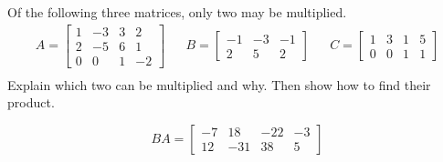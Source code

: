 
\begin{exerciseStatement}


Of the following three matrices, only two may be multiplied. 
\begin{align*} A= \left[\begin{array}{cccc}
1 & -3 & 3 & 2 \\
2 & -5 & 6 & 1 \\
0 & 0 & 1 & -2
\end{array}\right]  & & B= \left[\begin{array}{ccc}
-1 & -3 & -1 \\
2 & 5 & 2
\end{array}\right]  & & C= \left[\begin{array}{cccc}
1 & 3 & 1 & 5 \\
0 & 0 & 1 & 1
\end{array}\right]  \\ \end{align*}
             Explain which two can be multiplied and why. Then show how to find their product.


\end{exerciseStatement}
    
\begin{exerciseAnswer} 
\[BA= \left[\begin{array}{cccc}
-7 & 18 & -22 & -3 \\
12 & -31 & 38 & 5
\end{array}\right] \]
\end{exerciseAnswer}
    
